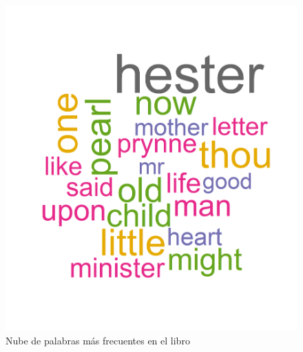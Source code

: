 \documentclass[fontsize=12pt]{article}
\begin{document}
\begin{figure}
\centering
\includegraphics[scale=0.8]{Figures/wordcloud.png}
\caption{Nube de palabras más frecuentes en el libro}
\label{worldcloud}
\end{figure}




\end{document}
